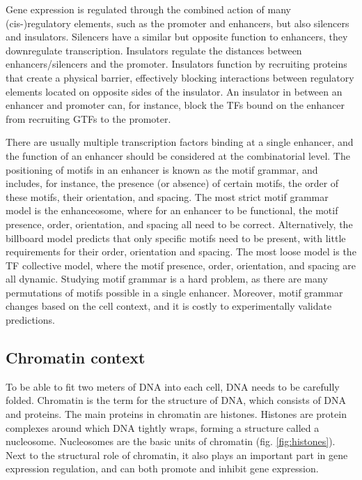 Gene expression is regulated through the combined action of many (cis-)regulatory elements, such as the promoter and enhancers, but also silencers and insulators\cite{Spitz2012}. Silencers have a similar but opposite function to enhancers, they downregulate transcription. Insulators regulate the distances between enhancers/silencers and the promoter. Insulators function by recruiting proteins that create a physical 
barrier, effectively blocking interactions between regulatory elements located on opposite sides of the insulator. An insulator in between an enhancer and promoter can, for instance, block the TFs bound on the enhancer from recruiting GTFs to the promoter.

There are usually multiple transcription factors binding at a single enhancer, and the function of an enhancer should be considered at the combinatorial level\cite{Spitz2012}. The positioning of motifs in an enhancer is known as the motif grammar, and includes, for instance, the presence (or absence) of certain motifs, the order of these motifs, their orientation, and spacing\cite{Nagy2020}. The most strict motif grammar model is the enhanceosome, where for an enhancer to be functional, the motif presence, order, orientation, and spacing all need to be correct\cite{Arnosti2005}. Alternatively, the billboard model predicts that only specific motifs need to be present, with little requirements for their order, orientation and spacing. The most loose model is the TF collective model,  where the motif presence, order, orientation, and spacing are all dynamic\cite{Long2016}. Studying motif grammar is a hard problem, as there are many permutations of motifs possible in a single enhancer. Moreover, motif grammar changes based on the cell context, and it is costly to experimentally validate predictions. 

\subsection{Chromatin context}

To be able to fit two meters of DNA into each cell, DNA needs to be carefully folded. Chromatin is the term for the structure of DNA, which consists of DNA and proteins. The main proteins in chromatin are histones. Histones are protein complexes around which DNA tightly wraps, forming a structure called a nucleosome. Nucleosomes are the basic units of chromatin (fig. \ref{fig:histones}). Next to the structural role of chromatin,  it also plays an important part in gene expression regulation, and can both promote and inhibit gene expression.

